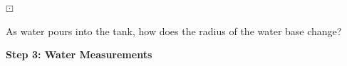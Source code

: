 \documentclass{ximera}
\begin{document}
\begin{question} $\boxdot$ 

As water pours into the tank, how does the radius of the water base change?

\begin{multipleChoice}
\end{multipleChoice}

\end{question}









\textbf{\textcolor{purple!85!blue}{Step 3: Water Measurements}}
\end{document}
